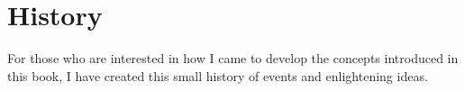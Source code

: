 %
%
%
%
%
%
%

\section{History}
\label{history_heading}

For those who are interested in how I came to develop the concepts introduced
in this book, I have created this small history of events and enlightening ideas.

